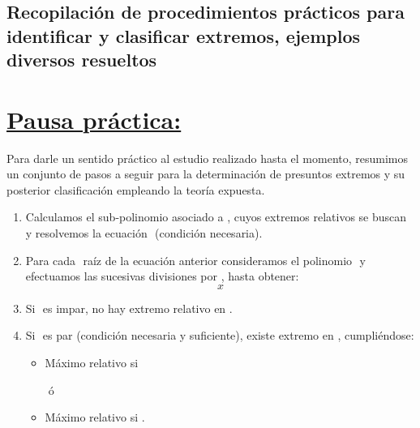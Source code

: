 \documentclass[12pt]{article}
\begin{document}
\subsection{
  Recopilación de procedimientos prácticos para identificar y clasificar extremos, ejemplos diversos resueltos
}
\section*{\ul{Pausa práctica:}}
Para darle un sentido práctico al estudio realizado hasta el momento, resumimos un conjunto de pasos a seguir para la determinación de presuntos extremos y su posterior clasificación empleando la teoría expuesta.

\begin{enumerate}
  \item Calculamos el sub-polinomio asociado a $ $, cuyos extremos relativos se buscan y resolvemos la ecuación $ $ (condición necesaria).

  \item Para cada $ $ raíz de la ecuación anterior consideramos el polinomio $ $ y efectuamos las sucesivas divisiones por $ $, hasta obtener:
        $$
          x
        $$

  \item Si $ $ es impar, no hay extremo relativo en $ $.

  \item Si $ $ es par (condición necesaria y suficiente), existe extremo en $ $, cumpliéndose:
        \begin{itemize}
          \item Máximo relativo si $ $
        \end{itemize}
        \ \ \ \ ó
        \begin{itemize}
          \item Máximo relativo si $ $.
        \end{itemize}
\end{enumerate}
\end{document}
